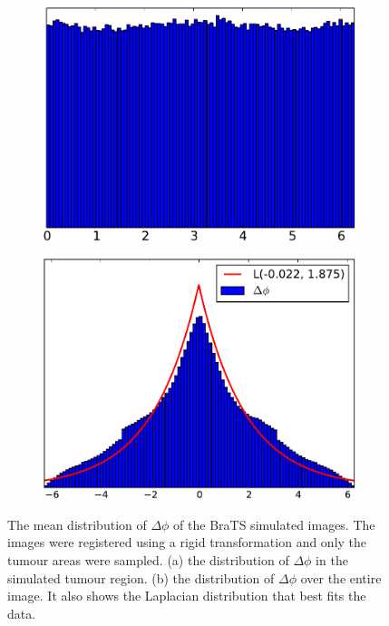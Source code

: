 \begin{figure}
    \centering
    \hspace*{\fill}
    \begin{subfigure}[b]{0.46\columnwidth}
    \includegraphics[width=\textwidth]{statistical_normals/images/distributions/delta_phi_tumour-crop}
    \caption{}\label{subfig:singl_img_phi_tumour}
    \end{subfigure}
    \hfill
    \begin{subfigure}[b]{0.45\columnwidth}
    \includegraphics[width=\textwidth]{statistical_normals/images/distributions/delta_phi_all_laplacian-crop}
    \caption{}\label{subfig:singl_img_phi_all}
    \end{subfigure}
    \hspace*{\fill}
    \caption{The mean distribution of $\Delta \phi$ of the BraTS simulated images.
             The images were registered using a
             rigid transformation and only the tumour
             areas were sampled. (a) the distribution of $\Delta \phi$
             in the simulated tumour region. (b) the distribution of
             $\Delta \phi$ over the entire image. It also shows the
             Laplacian distribution that best fits the data.}
\label{fig:singl_img_phi_distribution}
\end{figure}
